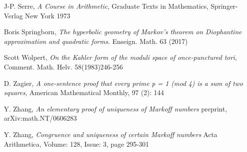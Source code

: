 \documentclass[12pt,a4paper]{amsart}
\begin{document}
J-P. Serre,
\textit{A Course in Arithmetic},
Graduate Texts in Mathematics,
Springer-Verlag New York
1973

Boris Springborn, 
\textit{The hyperbolic geometry of Markov’s theorem on Diophantine
approximation and quadratic forms.} Enseign. Math. 63 (2017)

Scott Wolpert,
\textit{On the Kahler form of the moduli space of once-punctured tori}, 
Comment. Math. Helv. 58(1983)246-256

D. Zagier,
 \textit{A one-sentence proof that every prime p = 1 (mod 4) is a sum of two squares}, 
 American Mathematical Monthly, 97 (2): 144
 
 Y. Zhang,
 \textit{ An elementary proof of uniqueness of Markoff numbers}
 preprint, arXiv:math.NT/0606283
 
   Y. Zhang,
 \textit{Congruence and uniqueness of certain Markoff numbers}
 Acta Arithmetica, Volume: 128, Issue: 3, page 295-301



%

%
%
%
%
%
%
%



% 
 
\end{document}
